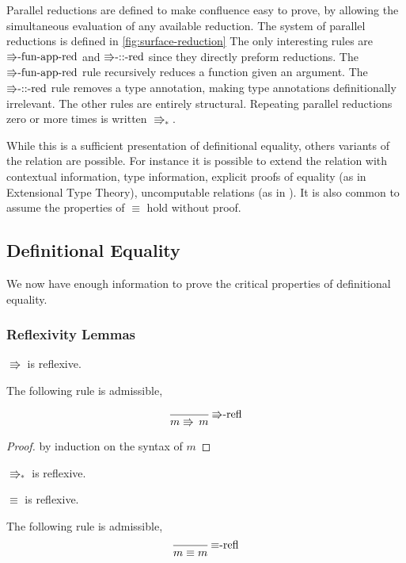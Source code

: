 Parallel reductions are defined to make confluence easy to prove, by allowing the simultaneous evaluation of any available reduction.
The system of parallel reductions is defined in \ref{fig:surface-reduction} The only interesting rules are $\textrm{\ensuremath{\Rrightarrow}-fun-app-red}$ and $\textrm{\ensuremath{\Rrightarrow}-::-red}$ since they directly preform reductions.
The $\textrm{\ensuremath{\Rrightarrow}-fun-app-red}$ rule recursively reduces a function given an argument.
The $\textrm{\ensuremath{\Rrightarrow}-::-red}$ rule removes a type annotation, making type annotations definitionally irrelevant.
The other rules are entirely structural.
Repeating parallel reductions zero or more times is written $\Rrightarrow_{\ast}$.

While this is a sufficient presentation of definitional equality, others variants of the relation are possible.
For instance it is possible to extend the relation with contextual information, type information, explicit proofs of equality (as in Extensional Type Theory), uncomputable relations (as in \cite{jia2010dependent}).
It is also common to assume the properties of $\equiv$ hold without proof.

\subsection{Definitional Equality}

We now have enough information to prove the critical properties of definitional equality.

\subsubsection{Reflexivity Lemmas}
\begin{lem}
$\Rrightarrow$ is reflexive.

The following rule is admissible,

\[
\frac{\,}{m\Rrightarrow\,m}\,\textrm{\ensuremath{\Rrightarrow}-refl}
\]
\end{lem}

\begin{proof}
by induction on the syntax of $m$
\end{proof}
\begin{fact}
$\Rrightarrow_{\ast}$ is reflexive.
\end{fact}

\begin{lem}
$\equiv$ is reflexive.

The following rule is admissible,
\[
\frac{\,}{m\equiv m}\,\textrm{\ensuremath{\equiv}-refl}
\]
\end{lem}

